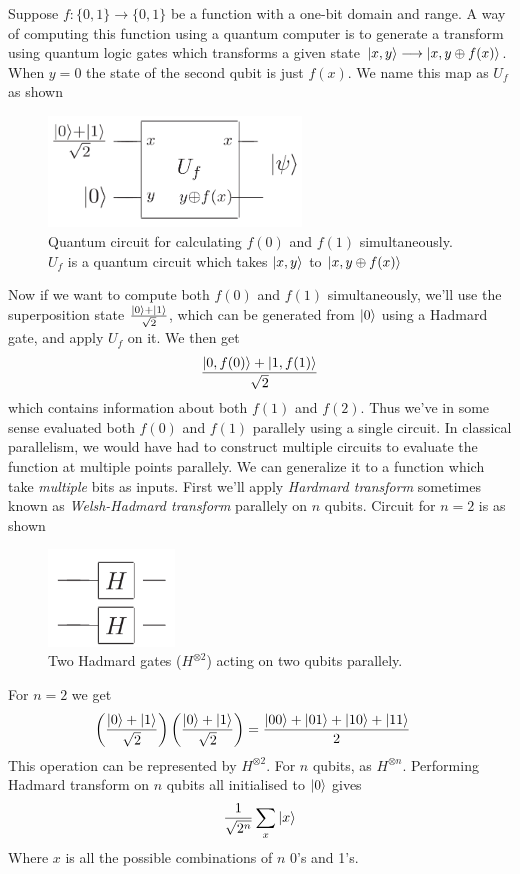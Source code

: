 Suppose $f:\{0,1\}\xrightarrow{}\{0,1\}$ be a function with a one-bit domain and range. A way of computing this function using a quantum computer is to generate a transform using quantum logic gates which transforms a given state $\ket{x,y} \longrightarrow \ket{x, y\oplus f(x)}$. When $y=0$ the state of the second qubit is just $f(x)$. We name this map as $U_f$ as shown
\begin{figure}[H]
    \centering
    \includegraphics[width=0.6\textwidth]{images/parallelism.png}
    \caption{Quantum circuit for calculating $f(0)$ and $f(1)$ simultaneously. $U_f$ is a quantum circuit which takes $\ket{x,y}$ to $\ket{x, y\oplus f(x)}$}
    \label{fig:parallelism}
\end{figure}
Now if we want to compute both $f(0)$ and $f(1)$ simultaneously, we'll use the superposition state $\frac{\ket{0} + \ket{1}}{\sqrt{2}}$, which can be generated from $\ket{0}$ using a Hadmard gate, and apply $U_f$ on it. We then get
\begin{equation}
    \frac{\ket{0, f(0)}+\ket{1, f(1)}}{\sqrt{2}}
\end{equation}
which contains information about both $f(1)$ and $f(2)$. Thus we've in some sense evaluated both $f(0)$ and $f(1)$ parallely using a single circuit. In classical parallelism, we would have had to construct multiple circuits to evaluate the function at multiple points parallely. We can generalize it to a function which take \textit{multiple} bits as inputs. First we'll apply \textit{Hardmard transform} sometimes known as \textit{Welsh-Hadmard transform} parallely on $n$ qubits. Circuit for $n=2$ is as shown
\begin{figure}[H]
    \centering
    \includegraphics[width=0.3\textwidth]{images/parallel_hadmard.png}
    \caption{Two Hadmard gates ($H^{\otimes 2}$) acting on two qubits parallely.}
    \label{fig:parallel-hadmard}
\end{figure}
For $n=2$ we get
\begin{align}
    \left( \frac{\ket{0} + \ket{1}}{\sqrt{2}} \right) \left( \frac{\ket{0} + \ket{1}}{\sqrt{2}} \right)
    &= \frac{\ket{00}+\ket{01}+\ket{10}+\ket{11}}{2}
\end{align}
This operation can be represented by $H^{\otimes 2}$. For $n$ qubits, as $H^{\otimes n}$. Performing Hadmard transform on $n$ qubits all initialised to $\ket{0}$ gives
\begin{equation}
    \frac{1}{\sqrt{2^n}}\sum_x \ket{x}
    \label{hadmard-eqn-n-qubits}
\end{equation}
Where $x$ is all the possible combinations of $n$ 0's and 1's. 

